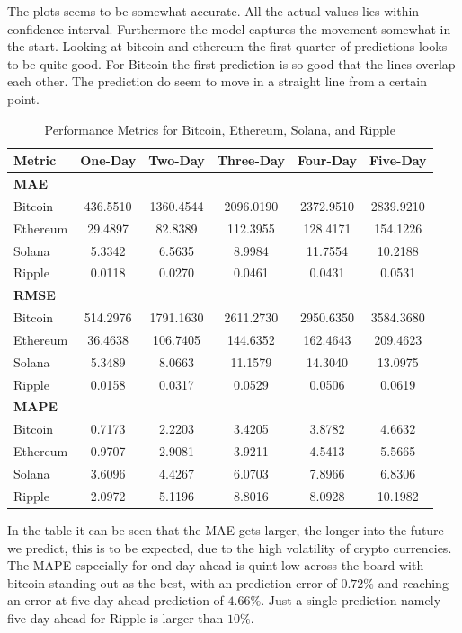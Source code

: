 \noindent The plots seems to be somewhat accurate. All the actual values lies within confidence interval. Furthermore the model captures the movement somewhat in the start. Looking at bitcoin and ethereum the first quarter of predictions looks to be quite good. For Bitcoin the first prediction is so good that the lines overlap each other. The prediction do seem to move in a straight line from a certain point.

\begin{table}[H]
\centering
\caption{Performance Metrics for Bitcoin, Ethereum, Solana, and Ripple}
\begin{tabular}{lccccc}
\toprule
\textbf{Metric} & \textbf{One-Day} & \textbf{Two-Day} & \textbf{Three-Day} & \textbf{Four-Day} & \textbf{Five-Day} \\
\midrule
\textbf{MAE} & & & & & \\
Bitcoin   & 436.5510 & 1360.4544 & 2096.0190 & 2372.9510 & 2839.9210 \\
Ethereum  &  29.4897 &   82.8389 &  112.3955 &  128.4171 &  154.1226 \\
Solana    &   5.3342 &    6.5635 &    8.9984 &   11.7554 &   10.2188 \\
Ripple    &   0.0118 &    0.0270 &    0.0461 &    0.0431 &    0.0531 \\
\midrule
\textbf{RMSE} & & & & & \\
Bitcoin   & 514.2976 & 1791.1630 & 2611.2730 & 2950.6350 & 3584.3680 \\
Ethereum  &  36.4638 &  106.7405 &  144.6352 &  162.4643 &  209.4623 \\
Solana    &   5.3489 &    8.0663 &   11.1579 &   14.3040 &   13.0975 \\
Ripple    &   0.0158 &    0.0317 &    0.0529 &    0.0506 &    0.0619 \\
\midrule
\textbf{MAPE} & & & & & \\
Bitcoin   &   0.7173 &    2.2203 &    3.4205 &    3.8782 &    4.6632 \\
Ethereum  &   0.9707 &    2.9081 &    3.9211 &    4.5413 &    5.5665 \\
Solana    &   3.6096 &    4.4267 &    6.0703 &    7.8966 &    6.8306 \\
Ripple    &   2.0972 &    5.1196 &    8.8016 &    8.0928 &   10.1982 \\
\bottomrule
\end{tabular}
\end{table}
\noindent In the table it can be seen that the MAE gets larger, the longer into the future we predict, this is to be expected, due to the high volatility of crypto currencies. The MAPE especially for ond-day-ahead is quint low across the board with bitcoin standing out as the best, with an prediction error of $0.72\%$ and reaching an error at five-day-ahead prediction of $4.66\%$. Just a single prediction namely five-day-ahead for Ripple is larger than $10\%$.\\


